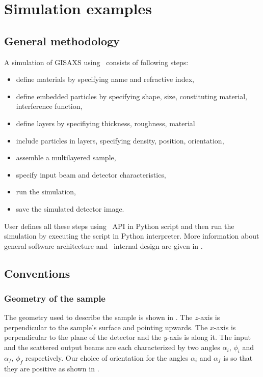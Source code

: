 \newpage
\chapter{Simulation examples}  

\section{General methodology}
A simulation of GISAXS using \BornAgain\ consists of following steps:
\begin{itemize}
\item define materials by specifying name and refractive index,
\item define embedded particles by specifying shape, size,
   constituting material, interference function,
\item define layers by specifiying thickness, roughness, material
\item include particles in layers, specifying density, position, orientation, 
\item assemble a multilayered sample,
\item specify input beam and detector characteristics,
\item run the simulation,
\item save the simulated detector image.
\end{itemize}

\noindent
User defines all these steps using \BornAgain\ API in Python script and then run 
the simulation by executing the script in Python interpreter.
More information about general software architecture and \BornAgain\ internal design
are given in .


\section{Conventions}

\subsection{Geometry of the sample}

\noindent The geometry used to describe the sample is shown in . The $z$-axis is perpendicular to the sample's
surface and pointing upwards. The $x$-axis  is perpendicular to the
plane of the detector and the $y$-axis is along it. The input and the
scattered output beams are each characterized by two angles
$\alpha_i$, $\phi_i$ and $\alpha_f$, $\phi_f$ respectively. Our choice of orientation for the
angles $\alpha_i$ and $\alpha_f$ is so that they are positive as shown in . \\

